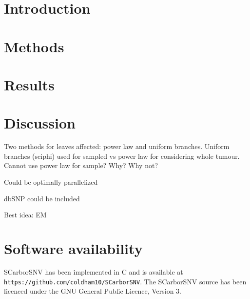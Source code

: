 \documentclass{article}
\begin{document}
\nocite{*}


\doublespacing


\section{Introduction}


\section{Methods}


\section{Results}

\section{Discussion}

Two methods for leaves affected: power law and uniform branches. Uniform branches (sciphi) used for sampled vs power law for considering whole tumour. Cannot use power law for sample? Why? Why not?

Could be optimally parallelized

dbSNP could be included

Best idea: EM


\section{Software availability}
SCarborSNV has been implemented in C and is available at \texttt{https://github.com/coldham10/SCarborSNV}. 
The SCarborSNV source has been licenced under the GNU General Public Licence, Version 3.




\newpage



\newpage
\appendix

\end{document}
